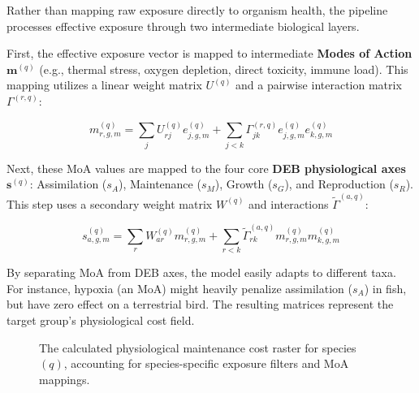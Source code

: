 \documentclass[11pt,a4paper]{article}
\begin{document}
Rather than mapping raw exposure directly to organism health, the pipeline processes effective exposure through two intermediate biological layers. 

First, the effective exposure vector is mapped to intermediate \textbf{Modes of Action} $\bm{m}^{(q)}$ (e.g., thermal stress, oxygen depletion, direct toxicity, immune load). This mapping utilizes a linear weight matrix $U^{(q)}$ and a pairwise interaction matrix $\Gamma^{(r,q)}$:

\begin{equation}
 m_{r, g, m}^{(q)} = \sum_{j} U_{rj}^{(q)} e_{j, g, m}^{(q)} + \sum_{j<k} \Gamma_{jk}^{(r,q)} e_{j,g,m}^{(q)} e_{k,g,m}^{(q)}
\end{equation}

Next, these MoA values are mapped to the four core \textbf{DEB physiological axes} $\bm{s}^{(q)}$: Assimilation ($s_A$), Maintenance ($s_M$), Growth ($s_G$), and Reproduction ($s_R$). This step uses a secondary weight matrix $W^{(q)}$ and interactions $\tilde{\Gamma}^{(a,q)}$:

\begin{equation}
 s_{a,g,m}^{(q)} = \sum_{r} W_{ar}^{(q)} m_{r,g,m}^{(q)} + \sum_{r<k} \tilde{\Gamma}_{rk}^{(a,q)} m_{r,g,m}^{(q)} m_{k,g,m}^{(q)}
\end{equation}

By separating MoA from DEB axes, the model easily adapts to different taxa. For instance, hypoxia (an MoA) might heavily penalize assimilation ($s_A$) in fish, but have zero effect on a terrestrial bird. The resulting matrices represent the target group's physiological cost field.

\begin{figure}[H]
\centering
{}
\caption{The calculated physiological maintenance cost raster for species $(q)$, accounting for species-specific exposure filters and MoA mappings.}
\end{figure}
\end{document}
